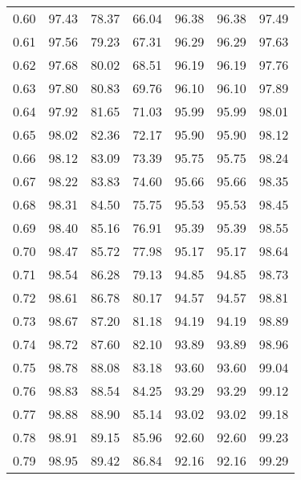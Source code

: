 \begin{tabular}{|c|c|c|c|c|c|c|}
      0.60 &     97.43 &     78.37 &      66.04 &   96.38 &      96.38 &         97.49 \\
      0.61 &     97.56 &     79.23 &      67.31 &   96.29 &      96.29 &         97.63 \\
      0.62 &     97.68 &     80.02 &      68.51 &   96.19 &      96.19 &         97.76 \\
      0.63 &     97.80 &     80.83 &      69.76 &   96.10 &      96.10 &         97.89 \\
      0.64 &     97.92 &     81.65 &      71.03 &   95.99 &      95.99 &         98.01 \\
      0.65 &     98.02 &     82.36 &      72.17 &   95.90 &      95.90 &         98.12 \\
      0.66 &     98.12 &     83.09 &      73.39 &   95.75 &      95.75 &         98.24 \\
      0.67 &     98.22 &     83.83 &      74.60 &   95.66 &      95.66 &         98.35 \\
      0.68 &     98.31 &     84.50 &      75.75 &   95.53 &      95.53 &         98.45 \\
      0.69 &     98.40 &     85.16 &      76.91 &   95.39 &      95.39 &         98.55 \\
      0.70 &     98.47 &     85.72 &      77.98 &   95.17 &      95.17 &         98.64 \\
      0.71 &     98.54 &     86.28 &      79.13 &   94.85 &      94.85 &         98.73 \\
      0.72 &     98.61 &     86.78 &      80.17 &   94.57 &      94.57 &         98.81 \\
      0.73 &     98.67 &     87.20 &      81.18 &   94.19 &      94.19 &         98.89 \\
      0.74 &     98.72 &     87.60 &      82.10 &   93.89 &      93.89 &         98.96 \\
      0.75 &     98.78 &     88.08 &      83.18 &   93.60 &      93.60 &         99.04 \\
      0.76 &     98.83 &     88.54 &      84.25 &   93.29 &      93.29 &         99.12 \\
      0.77 &     98.88 &     88.90 &      85.14 &   93.02 &      93.02 &         99.18 \\
      0.78 &     98.91 &     89.15 &      85.96 &   92.60 &      92.60 &         99.23 \\
      0.79 &     98.95 &     89.42 &      86.84 &   92.16 &      92.16 &         99.29 \\

\end{tabular}
